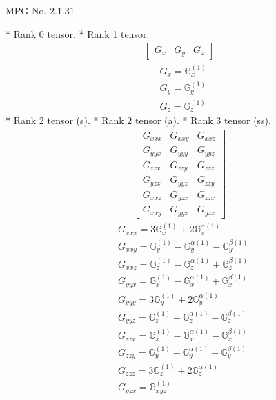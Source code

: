\documentclass[fleqn,8pt,landscape]{jsarticle}
\begin{document}
\setcounter{MaxMatrixCols}{32}

\renewcommand{\tablename}{Table~}
\renewcommand{\figurename}{Figure~}
\begin{center}
\LARGE
MPG No. 2.1.3\quad$\bar{1}$
\end{center}
* Rank 0 tensor.
* Rank 1 tensor.
\begin{align*}
\begin{bmatrix} G_{x} & G_{y} & G_{z} \end{bmatrix}
\end{align*}
\begin{align*}
& G_{x} = \mathbb{G}_{x}^{(1)} \\
& G_{y} = \mathbb{G}_{y}^{(1)} \\
& G_{z} = \mathbb{G}_{z}^{(1)}
\end{align*}
* Rank 2 tensor (s).
* Rank 2 tensor (a).
* Rank 3 tensor (ss).
\begin{align*}
\begin{bmatrix} G_{xxx} & G_{xxy} & G_{xxz} \\ G_{yyx} & G_{yyy} & G_{yyz} \\ G_{zzx} & G_{zzy} & G_{zzz} \\ G_{yzx} & G_{yyz} & G_{zzy} \\ G_{xxz} & G_{yzx} & G_{zzx} \\ G_{xxy} & G_{yyx} & G_{yzx} \end{bmatrix}
\end{align*}
\begin{align*}
& G_{xxx} = 3 \mathbb{G}_{x}^{(1)} + 2 \mathbb{G}_{x}^{\alpha(1)} \\
& G_{xxy} = \mathbb{G}_{y}^{(1)} - \mathbb{G}_{y}^{\alpha(1)} - \mathbb{G}_{y}^{\beta(1)} \\
& G_{xxz} = \mathbb{G}_{z}^{(1)} - \mathbb{G}_{z}^{\alpha(1)} + \mathbb{G}_{z}^{\beta(1)} \\
& G_{yyx} = \mathbb{G}_{x}^{(1)} - \mathbb{G}_{x}^{\alpha(1)} + \mathbb{G}_{x}^{\beta(1)} \\
& G_{yyy} = 3 \mathbb{G}_{y}^{(1)} + 2 \mathbb{G}_{y}^{\alpha(1)} \\
& G_{yyz} = \mathbb{G}_{z}^{(1)} - \mathbb{G}_{z}^{\alpha(1)} - \mathbb{G}_{z}^{\beta(1)} \\
& G_{zzx} = \mathbb{G}_{x}^{(1)} - \mathbb{G}_{x}^{\alpha(1)} - \mathbb{G}_{x}^{\beta(1)} \\
& G_{zzy} = \mathbb{G}_{y}^{(1)} - \mathbb{G}_{y}^{\alpha(1)} + \mathbb{G}_{y}^{\beta(1)} \\
& G_{zzz} = 3 \mathbb{G}_{z}^{(1)} + 2 \mathbb{G}_{z}^{\alpha(1)} \\
& G_{yzx} = \mathbb{G}_{xyz}^{(1)}
\end{align*}
\end{document}
